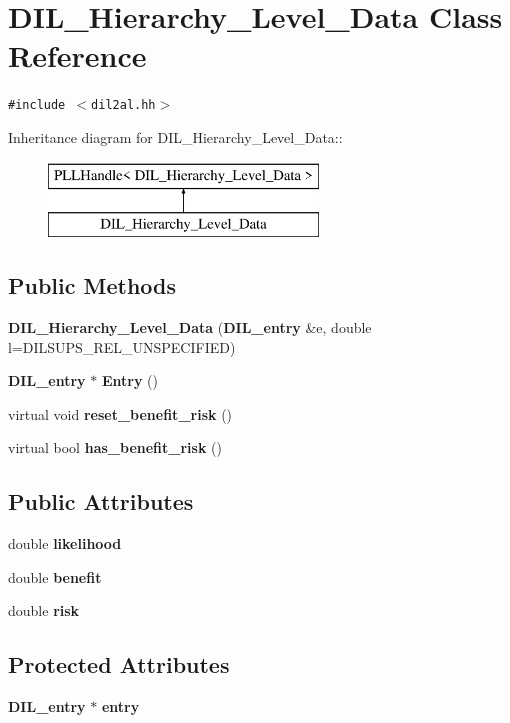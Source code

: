 \section{DIL\_\-Hierarchy\_\-Level\_\-Data  Class Reference}
\label{classDIL__Hierarchy__Level__Data}
{\tt \#include $<$dil2al.hh$>$}

Inheritance diagram for DIL\_\-Hierarchy\_\-Level\_\-Data::\begin{figure}[H]
\begin{center}
\leavevmode
\includegraphics[height=2cm]{classDIL__Hierarchy__Level__Data}
\end{center}
\end{figure}
\subsection*{Public Methods}
\begin{CompactItemize}
\item 
{\bf DIL\_\-Hierarchy\_\-Level\_\-Data} ({\bf DIL\_\-entry} \&e, double l=DILSUPS\_\-REL\_\-UNSPECIFIED)
\item 
{\bf DIL\_\-entry} $\ast$ {\bf Entry} ()
\item 
virtual void {\bf reset\_\-benefit\_\-risk} ()
\item 
virtual bool {\bf has\_\-benefit\_\-risk} ()
\end{CompactItemize}
\subsection*{Public Attributes}
\begin{CompactItemize}
\item 
double {\bf likelihood}
\item 
double {\bf benefit}
\item 
double {\bf risk}
\end{CompactItemize}
\subsection*{Protected Attributes}
\begin{CompactItemize}
\item 
{\bf DIL\_\-entry} $\ast$ {\bf entry}
\end{CompactItemize}


